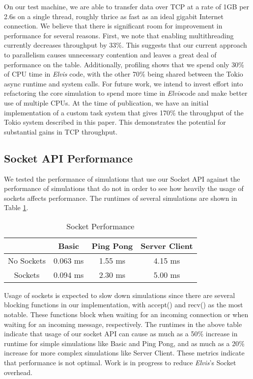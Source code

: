 \documentclass[journal]{IEEEtran} %
\newcommand{\elvis}{\textit{Elvis}}
\begin{document}
On our test machine, we are able to transfer data over TCP at a rate of 1GB per 2.6s on a single thread, roughly thrice as fast as an ideal gigabit Internet connection. We believe that there is significant room for improvement in performance for several reasons. First, we note that enabling multithreading currently decreases throughput by 33\%. This suggests that our current approach to parallelism causes unnecessary contention and  leaves a great deal of performance on the table. Additionally, profiling shows that we spend only 30\% of CPU time in \elvis{} code, with the other 70\% being shared between the Tokio async runtime and system calls. For future work, we intend to invest effort into refactoring the core simulation to spend more time in \elvis code and make better use of multiple CPUs. At the time of publication, we have an initial implementation of a custom task system that gives 170\% the throughput of the Tokio system described in this paper. This demonstrates the potential for substantial gains in TCP throughput. 

\subsection{Socket API Performance}
We tested the performance of simulations that use our  Socket API against the performance of simulations that do not in order to see how heavily the usage of sockets affects performance. The runtimes of several simulations are shown in Table \ref{tab:socket_perf}.

\begin{table}[H]
    \caption{Socket Performance}
    \begin{center}
        \begin{tabular}{|c|c|c|c|}
            \hline
            \textbf{} & \textbf{Basic} & \textbf{Ping Pong} & \textbf{Server Client} \\
            \hline
            No Sockets & 0.063 ms & 1.55 ms & 4.15 ms \\
            \hline
            Sockets & 0.094 ms & 2.30 ms & 5.00 ms \\
            \hline
        \end{tabular}
        \label{tab:socket_perf}
    \end{center}
\end{table}

Usage of sockets is expected to slow down simulations since there are several blocking functions in our implementation, with accept() and recv() as the most notable. These functions block when waiting for an incoming connection or when waiting for an incoming message, respectively. The runtimes in the above table indicate that usage of our socket API can cause as much as a 50\% increase in runtime for simple simulations like Basic and Ping Pong, and as much as a 20\% increase for more complex simulations like Server Client. These metrics indicate that performance is not optimal. Work is in progress to reduce \elvis{}'s Socket overhead.
\end{document}
